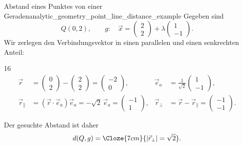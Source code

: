 \begin{ExampleBox}{Abstand eines Punktes von einer Geraden}{analytic_geometry_point_line_distance_example}
  Gegeben sind
  \[
    Q(0,2),
    \qquad
    g:\quad\vec x=\begin{pmatrix}2\\2\end{pmatrix}
      +\lambda\begin{pmatrix}1\\-1\end{pmatrix}.
  \]
  Wir zerlegen den Verbindungsvektor in einen parallelen und einen
  senkrechten Anteil:
  \begin{ClozeArea}[34]{16}
    \[
      \begin{aligned}
        \vec r
          &=\begin{pmatrix}0\\2\end{pmatrix}
            -\begin{pmatrix}2\\2\end{pmatrix}
            =\begin{pmatrix}-2\\0\end{pmatrix},
        &
        \vec e_a
          &=\frac1{\sqrt2}\begin{pmatrix}1\\-1\end{pmatrix},\\[1em]
        \vec r_{\parallel}
          &=(\vec r\cdot\vec e_a)\vec e_a
            =-\sqrt2\,\vec e_a
            =\begin{pmatrix}-1\\1\end{pmatrix},
        &
        \vec r_{\perp}
          &=\vec r-\vec r_{\parallel}
            =\begin{pmatrix}-1\\-1\end{pmatrix}.
      \end{aligned}
    \]
  \end{ClozeArea}
  Der gesuchte Abstand ist daher
  \[
    d(Q,g)=\Cloze{7cm}{\lvert\vec r_{\perp}\rvert=\sqrt2}.
  \]
\end{ExampleBox}
